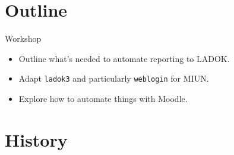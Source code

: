 \mode*

\section{Outline}

\begin{frame}
  \begin{block}{Workshop}
    \begin{itemize}
      \item Outline what's needed to automate reporting to LADOK.
      \item Adapt \texttt{ladok3} and particularly \texttt{weblogin} for MIUN.
      \item Explore how to automate things with Moodle.
    \end{itemize}
  \end{block}
\end{frame}


\section{History}


